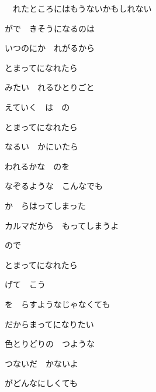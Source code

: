 　れたところにはもうないかもしれない

\bigskip

がで　きそうになるのは

いつのにか　れがるから

\bigskip

とまってになれたら

みたい　れるひとりごと

えていく　は　の

とまってになれたら

なるい　かにいたら

われるかな　のを

なぞるような　こんなでも

\bigskip

か　らはってしまった

カルマだから　もってしまうよ

ので

\bigskip

とまってになれたら

げて　こう

を　らすようなじゃなくても

だからまってになりたい

色とりどりの　つような

つないだ　かないよ

がどんなにしくても
